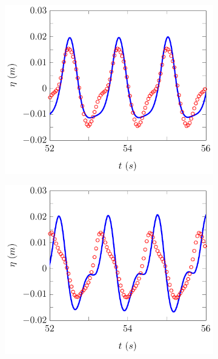 \begin{figure}
	\centering
	\begin{subfigure}{0.5\textwidth}
		\includegraphics[width=\textwidth]{./chp6/figures/Experiment/Beji/sh/FEVMWG5.pdf}
		\vspace{0.5cm}
	\end{subfigure}%
	\begin{subfigure}{0.5\textwidth}
		\includegraphics[width=\textwidth]{./chp6/figures/Experiment/Beji/sh/FEVMWG6.pdf}
		\vspace{0.5cm}

\end{subfigure}
\end{figure}
